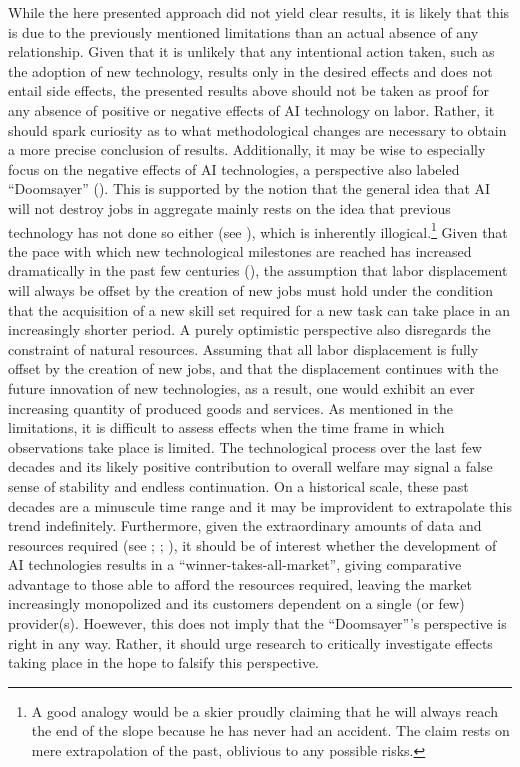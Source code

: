 \documentclass[
  12pt,
  a4paperpaper,
]{article}
\begin{document}
While the here presented approach did not yield clear results, it is
likely that this is due to the previously mentioned limitations than an
actual absence of any relationship. Given that it is unlikely that any
intentional action taken, such as the adoption of new technology,
results only in the desired effects and does not entail side effects,
the presented results above should not be taken as proof for any absence
of positive or negative effects of AI technology on labor. Rather, it
should spark curiosity as to what methodological changes are necessary
to obtain a more precise conclusion of results. Additionally, it may be
wise to especially focus on the negative effects of AI technologies, a
perspective also labeled ``Doomsayer''
(). This is
supported by the notion that the general idea that AI will not destroy
jobs in aggregate mainly rests on the idea that previous technology has
not done so either (see
), which is inherently illogical.\footnote{A good
  analogy would be a skier proudly claiming that he will always reach
  the end of the slope because he has never had an accident. The claim
  rests on mere extrapolation of the past, oblivious to any possible
  risks.} Given that the pace with which new technological milestones
are reached has increased dramatically in the past few centuries
(), the assumption
that labor displacement will always be offset by the creation of new
jobs must hold under the condition that the acquisition of a new skill
set required for a new task can take place in an increasingly shorter
period. A purely optimistic perspective also disregards the constraint
of natural resources. Assuming that all labor displacement is fully
offset by the creation of new jobs, and that the displacement continues
with the future innovation of new technologies, as a result, one would
exhibit an ever increasing quantity of produced goods and services. As
mentioned in the limitations, it is difficult to assess effects when the
time frame in which observations take place is limited. The
technological process over the last few decades and its likely positive
contribution to overall welfare may signal a false sense of stability
and endless continuation. On a historical scale, these past decades are
a minuscule time range and it may be improvident to extrapolate this
trend indefinitely. Furthermore, given the extraordinary amounts of data
and resources required (see ; ; ), it should be of interest whether the development of AI
technologies results in a ``winner-takes-all-market'', giving
comparative advantage to those able to afford the resources required,
leaving the market increasingly monopolized and its customers dependent
on a single (or few) provider(s). Hoewever, this does not imply that the
``Doomsayer'''s perspective is right in any way. Rather, it should urge
research to critically investigate effects taking place in the hope to
falsify this perspective.
\end{document}
